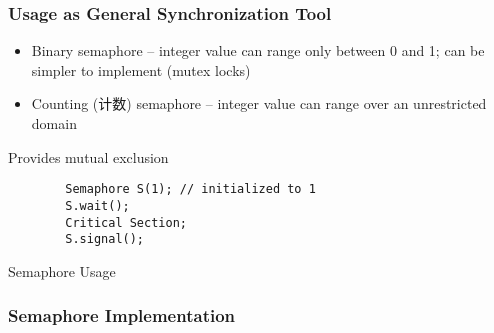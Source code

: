 \subsubsection{Usage as General Synchronization Tool}
\begin{itemize}
    \item Binary semaphore -- integer value can range only between 0 and 1; can be simpler to implement (mutex locks)
    \item Counting (计数) semaphore -- integer value can range over an unrestricted domain
\end{itemize}

Provides mutual exclusion
\begin{code}
    \begin{verbatim}
        Semaphore S(1); // initialized to 1
        S.wait();
        Critical Section;
        S.signal();
    \end{verbatim}
    \caption{Semaphore Usage}
\end{code}


\subsubsection{Semaphore Implementation}



